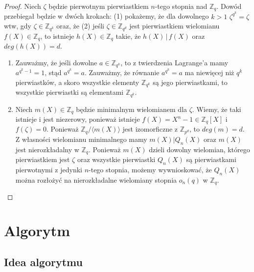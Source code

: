 \documentclass[polish,declaration,shortabstract]{iithesis}
\theoremstyle{definition}
\theoremstyle{remark} \newtheorem{observation}{Obserwacja}
\theoremstyle{plain} \newtheorem{theorem}{Twierdzenie}
\theoremstyle{plain} \newtheorem{lemma}{Lemat}
\theoremstyle{remark} \newtheorem*{remark*}{Uwaga}
\theoremstyle{reminder} \newtheorem*{reminder*}{Przypomnienie}
\begin{document}
\begin{proof}
	Niech $\zeta$ będzie pierwotnym pierwiastkiem $n$-tego stopnia nad $\mathbb{Z}_q$. Dowód przebiegał będzie w dwóch krokach: (1) pokażemy, że dla dowolnego $k > 1$ $\zeta^{q^k}=\zeta$ wtw, gdy $\zeta \in \mathbb{Z}_{q^k}$ oraz, że (2) jeśli $\zeta \in \mathbb{Z}_{q^d}$ jest pierwiastkiem wielomianu $f(X) \in \mathbb{Z}_q$, to istnieje $h(X) \in \mathbb{Z}_q$ takie, że $h(X) \, | \, f(X)$ oraz $deg(h(X)) = d$.\newline
	\begin{enumerate}[label=(\arabic*),leftmargin=.4in]
		\item Zauważmy, że jeśli dowolne $a \in \mathbb{Z}_{q^k}$, to z twierdzenia Lagrange'a mamy $a^{q^k-1} = 1$, stąd $a^{q^k} = a$. Zauważmy, że równanie $a^{q^k} = a$ ma niewięcej niż $q^k$ pierwiastków, a skoro wszystkie elementy $\mathbb{Z}_{q^k}$ są jego pierwiastkami, to wszystkie pierwiastki są elementami $\mathbb{Z}_{q^k}$.
		\item Niech $m(X) \in \mathbb{Z}_q$ będzie minimalnym wielomianem dla $\zeta$. Wiemy, że taki istnieje i jest niezerowy, ponieważ istnieje $f(X) = X^{n} - 1 \in \mathbb{Z}_q[X]$ i $f(\zeta) = 0$. Ponieważ $\mathbb{Z}_q / \langle m(X) \rangle$ jest izomorficzne z $\mathbb{Z}_{p^d}$, to $deg(m) = d$. Z własności wielomianu minimalnego mamy $m(X) | Q_n(X)$ oraz $m(X)$ jest nierozkładalny w $\mathbb{Z}_q$. \newline 
		      Ponieważ $m(X)$ dzieli dowolny wielomian, którego pierwiastkiem jest $\zeta$ oraz wszystkie pierwiastki $Q_n(X)$ są pierwiastkami pierwotnymi z jedynki $n$-tego stopnia, możemy wywnioskować, że $Q_n(X)$ można rozłożyć na nierozkładalne wielomiany stopnia $o_n(q)$ w $\mathbb{Z}_q$.
	\end{enumerate}
\end{proof}
	
\chapter{Algorytm}

\section{Idea algorytmu}
\end{document}
